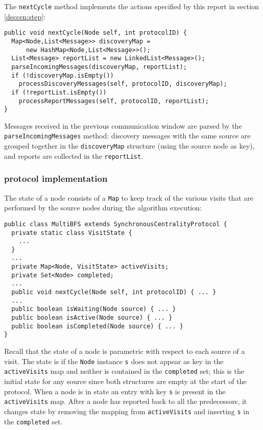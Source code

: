 The \texttt{nextCycle} method implements the actions specified by this report in section \ref{deccen:step}:
\begin{verbatim}
public void nextCycle(Node self, int protocolID) {
  Map<Node,List<Message>> discoveryMap =
      new HashMap<Node,List<Message>>();
  List<Message> reportList = new LinkedList<Message>();
  parseIncomingMessages(discoveryMap, reportList);
  if (!discoveryMap.isEmpty())
    processDiscoveryMessages(self, protocolID, discoveryMap);
  if (!reportList.isEmpty())
    processReportMessages(self, protocolID, reportList);
}
\end{verbatim}
Messages received in the previous communication window are parsed by the \texttt{parseIncomingMessages} method: discovery messages with the same source are grouped together in the \texttt{discoveryMap} structure (using the source node as key), and reports are collected in the \texttt{reportList}.

\subsubsection{\multibfs{} protocol implementation}

The state of a \multibfs{} node consists of a \texttt{Map} to keep track of the various visits that are performed by the source nodes during the algorithm execution:

\begin{verbatim}
public class MultiBFS extends SynchronousCentralityProtocol {
  private static class VisitState {
    ...
  }
  ...
  private Map<Node, VisitState> activeVisits;
  private Set<Node> completed;
  ...
  public void nextCycle(Node self, int protocolID) { ... }
  ...
  public boolean isWaiting(Node source) { ... }
  public boolean isActive(Node source) { ... }
  public boolean isCompleted(Node source) { ... }
}
\end{verbatim}
Recall that the state of a node is parametric with respect to each source of a visit. The state is  if the \texttt{Node} instance \texttt{s} does not appear as key in the \texttt{activeVisits} map and neither is contained in the \texttt{completed} set; this is the initial state for any source since both structures are empty at the start of the protocol. When a node is in state  an entry with key \texttt{s} is present in the \texttt{activeVisits} map. After a node has reported back to all the predecessors, it changes state  by removing the mapping from \texttt{activeVisits} and inserting \texttt{s} in the \texttt{completed} set.

